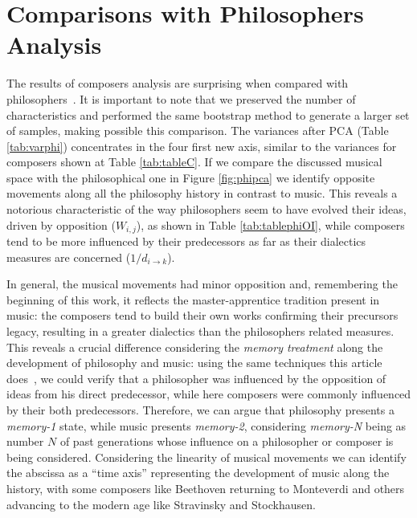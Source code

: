 \documentclass[
 aip,
 jmp,
 amsmath,amssymb,
 reprint,
]{revtex4-1}
\begin{document}
\section{Comparisons with Philosophers Analysis}

The results of composers analysis are surprising when compared with philosophers~\cite{Fabbri}. 
It is important to note that we preserved the
number of characteristics and performed the same bootstrap method to
generate a larger set of samples, making possible this
comparison. The variances after PCA (Table \ref{tab:varphi}) concentrates in the four
first new axis, similar to the variances for composers shown at Table \ref{tab:tableC}. If we compare the discussed musical space
with the philosophical one in Figure \ref{fig:phipca} we
identify opposite movements along all the philosophy history in contrast
to music. This reveals a notorious characteristic of the way
philosophers seem to have evolved their ideas, driven by opposition ($W_{i,j}$), as shown in Table \ref{tab:tablephiOI}, while
composers tend to be more influenced by their predecessors as far as their dialectics measures are
concerned ($1/d_{i \rightarrow k}$).

In general, the musical movements had minor opposition and,
remembering the beginning of this work, it reflects the
master-apprentice
tradition present in music: the composers tend to build their own
works confirming their precursors legacy, resulting in a greater
dialectics than the philosophers related measures.
This reveals a crucial difference
considering the \textit{memory treatment} along the development of
philosophy and music: using the same techniques this article does~\cite{Fabbri},
we could verify that a philosopher was influenced by the
opposition of ideas from his direct predecessor, while here composers were commonly
influenced by their both predecessors. Therefore, we can argue that philosophy
presents a \textit{memory-1} state, while music presents
\textit{memory-2}, considering \textit{memory-N} being as number $N$
of past generations whose influence on a philosopher or
composer is being considered. Considering the linearity of musical movements we can
identify the abscissa as a ``time axis'' representing the development
of music along the history, with some composers
like Beethoven returning to Monteverdi and others advancing to the
modern age like Stravinsky and Stockhausen.
\end{document}
